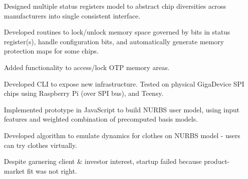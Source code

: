 \documentclass[]{deedy}
\begin{document}
\begin{minipage}[t]{0.69\textwidth}
\begin{flushleft}
\vspace{1.1pt}
\begin{tightemize}
\item Designed multiple status registers model to abstract chip diversities across manufacturers into single consistent interface.
\item Developed routines to lock/unlock memory space governed by bits in status register(s), handle configuration bits, and automatically generate memory protection maps for some chips.
\item Added functionality to access/lock OTP memory areas.
\item Developed CLI to expose new infrastructure. Tested on physical GigaDevice SPI chips using Raspberry Pi (over SPI bus), and Teensy.
\end{tightemize}
\sectionsep
%
\vspace{1.1pt}
\begin{tightemize}
\item Implemented prototype in JavaScript to build NURBS user model, using input features and weighted combination of precomputed basis models.
\item Developed algorithm to emulate dynamics for clothes on NURBS model - users can try clothes virtually.
\item Despite garnering client \& investor interest, startup failed because product-market fit was not right.
\end{tightemize}
\sectionsep
%
\end{flushleft}
\end{minipage}
%
\pagebreak
%
\end{document}
